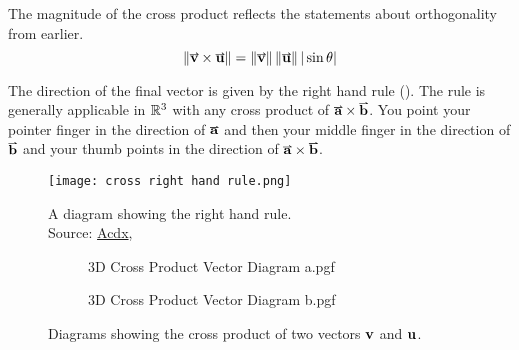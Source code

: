 \documentclass[main.tex]{subfiles}
\begin{document}
                The magnitude of the cross product reflects the statements about orthogonality from earlier.
                \begin{equation}
                    \vmod{\vect{v} \times \vect{u}} = \vmod{\vect{v}} \vmod{\vect{u}} |\sin\theta|
                    \label{eq: cross product magnitude}
                \end{equation}
                
                The direction of the final vector is given by the right hand rule (). The rule is generally applicable in $\mathbb{R}^3$ with any cross product of $\vect{a} \times \vect{b}$. You point your pointer finger in the direction of $\vect{a}$ and then your middle finger in the direction of $\vect{b}$ and your thumb points in the direction of $\vect{a} \times \vect{b}$.

                \begin{figure}[!h]
                    \centering
                    \vspace{-7mm}
                    \texttt{[image: cross right hand rule.png]}
                    \caption{A diagram showing the right hand rule.\\Source: \href{https://commons.wikimedia.org/wiki/File:Right_hand_rule_cross_product.svg}{Acdx}, \CCSA}
                    \label{fig: cross product right hand rule}
                \end{figure}

                \begin{figure}[!h]
                    \centering
                    \begin{subfigure}[t]{0.45\textwidth}
                        \centering
                        \scalebox{0.9}
                        {
                        \begin{adjustbox}{clip,trim=30mm 40mm 25mm 20mm}
                            {{3D Cross Product Vector Diagram a.pgf}}
                        \end{adjustbox}
                        }
                    \end{subfigure}
                    \hfill
                    \begin{subfigure}[t]{0.45\textwidth}
                        \centering
                        \scalebox{0.6}
                        {
                        \begin{adjustbox}{clip,trim=25mm 30mm 5mm 10mm}
                            {{3D Cross Product Vector Diagram b.pgf}}
                        \end{adjustbox}
                        }
                    \end{subfigure}
                    \vspace{-8mm}
                    \caption{Diagrams showing the cross product of two vectors $\boldsymbol{\mathbf{v}}$ and $\boldsymbol{\mathbf{u}}$.}
                \end{figure}
\end{document}
